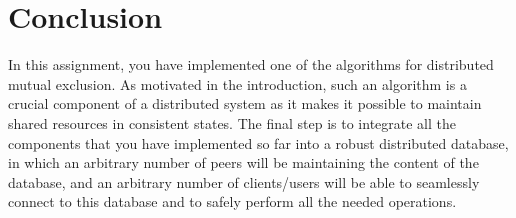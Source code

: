 \documentclass[a4paper]{article}
\begin{document}
\section{Conclusion}
In this assignment, you have implemented one of the algorithms for distributed
mutual exclusion. As motivated in the introduction, such an algorithm is a
crucial component of a distributed system as it makes it possible to maintain
shared resources in consistent states. The final step is to integrate all the
components that you have implemented so far into a robust distributed database,
in which an arbitrary number of peers will be maintaining the content of the
database, and an arbitrary number of clients/users will be able to seamlessly
connect to this database and to safely perform all the needed operations.

\printbibliography
\end{document}
